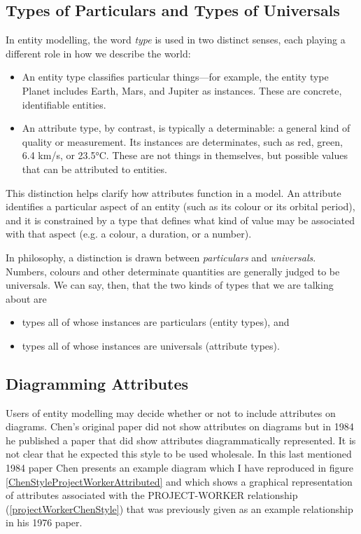 \subsection{Types of Particulars and Types of Universals}
In entity modelling, the word \textit{type} is used in two distinct senses, each playing a different role in how we describe the world:
\begin{itemize}
\item An entity type classifies particular things—for example, the entity type Planet includes Earth, Mars, and Jupiter as instances. These are concrete, identifiable entities.
\item An attribute type, by contrast, is typically a determinable: a general kind of quality or measurement. Its instances are determinates, such as red, green, 6.4 km/s, or 23.5°C. These are not things in themselves, but possible values that can be attributed to entities.
\end{itemize}
This distinction helps clarify how attributes function in a model. An attribute identifies a particular aspect of an entity (such as its colour or its orbital period), and it is constrained by a type that defines what kind of value may be associated with that aspect (e.g. a colour, a duration, or a number).

In philosophy, a distinction is drawn between \textit{particulars} and \textit{universals}. 
Numbers, colours and  other determinate quantities are generally judged to be universals. 
We can say, then, that the two kinds of types that we are
talking about are 
\begin{itemize}
\item types all of whose instances are particulars (entity types), and
\item types all of whose instances are universals (attribute types).  
\end{itemize} 

\subsection*{Diagramming Attributes}
\mynote
Users of entity modelling may decide whether or not to include attributes on diagrams. Chen's original paper did not show attributes on diagrams  but in 1984
he published a paper that did show attributes diagrammatically represented. 
It is not clear that he expected this style to be used wholesale. 
\mynote
In this last mentioned 1984 paper Chen presents an example diagram 
which I have reproduced in figure  \ref{ChenStyleProjectWorkerAttributed} 
and which shows a graphical representation of attributes associated with the PROJECT-WORKER relationship (\ref{projectWorkerChenStyle}) that was previously given as an example relationship in his 1976 paper.


